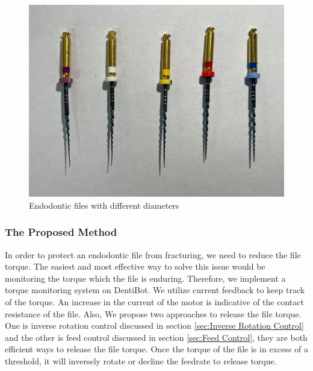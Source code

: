 \begin{figure}[htbp]
\begin{center}
\includegraphics[width=0.7\linewidth]{Images/files.jpg}
\caption{Endodontic files with different diameters
}\label{fig: files}
\end{center}
\end{figure}	
\subsubsection{The Proposed Method}
\hspace*{6mm}In order to protect an endodontic file from fracturing, we need to reduce the file torque. The easiest and most effective way to solve this issue would be monitoring the torque which the file is enduring. Therefore, we implement a torque monitoring system on DentiBot. We utilize current feedback to keep track of the torque. An increase in the current of the motor is indicative of the contact resistance of the file. Also, We propose two approaches to release the file torque. One is inverse rotation control discussed in section \ref{sec:Inverse Rotation Control} and the other is feed control discussed in section \ref{sec:Feed Control}, they are both efficient ways to release the file torque. Once the torque of the file is in excess of a threshold, it will inversely rotate or decline the feedrate to release torque. 
